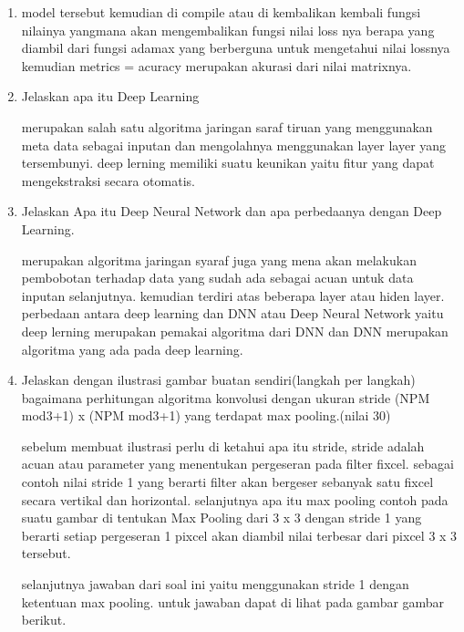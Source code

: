 \begin{enumerate}
\item model tersebut kemudian di compile atau di kembalikan kembali fungsi nilainya yangmana akan mengembalikan fungsi nilai loss nya berapa yang diambil dari fungsi adamax yang berberguna untuk  mengetahui nilai lossnya kemudian metrics = acuracy merupakan akurasi dari nilai matrixnya.

\item Jelaskan apa itu Deep Learning \par
merupakan salah satu algoritma jaringan saraf tiruan yang menggunakan meta data sebagai inputan dan mengolahnya menggunakan layer layer yang tersembunyi. deep lerning memiliki suatu keunikan yaitu fitur yang dapat mengekstraksi secara otomatis.

\item Jelaskan Apa itu Deep Neural Network dan apa perbedaanya dengan Deep Learning.\par
merupakan algoritma jaringan syaraf juga yang mena akan melakukan pembobotan terhadap data yang sudah ada sebagai acuan untuk data inputan selanjutnya. kemudian terdiri atas beberapa layer atau hiden layer. perbedaan antara deep learning dan DNN atau Deep Neural Network yaitu deep lerning merupakan pemakai algoritma dari DNN dan DNN merupakan algoritma yang ada pada deep learning.

\item Jelaskan dengan ilustrasi gambar buatan sendiri(langkah per langkah) bagaimana perhitungan algoritma konvolusi dengan ukuran stride (NPM mod3+1) x (NPM mod3+1) yang terdapat max pooling.(nilai 30)\par
 sebelum membuat ilustrasi perlu di ketahui apa itu stride, stride adalah acuan atau parameter yang menentukan pergeseran pada filter fixcel. sebagai contoh nilai stride 1 yang berarti filter akan bergeser sebanyak satu fixcel secara vertikal dan horizontal. selanjutnya apa itu max pooling contoh pada suatu gambar di tentukan Max Pooling dari 3 x 3 dengan stride 1 yang berarti setiap pergeseran 1 pixcel akan diambil nilai terbesar dari pixcel 3 x 3 tersebut.\par

selanjutnya jawaban dari soal ini yaitu menggunakan stride 1 dengan ketentuan max pooling. untuk jawaban dapat di lihat pada gambar gambar berikut. 

\end{enumerate}

